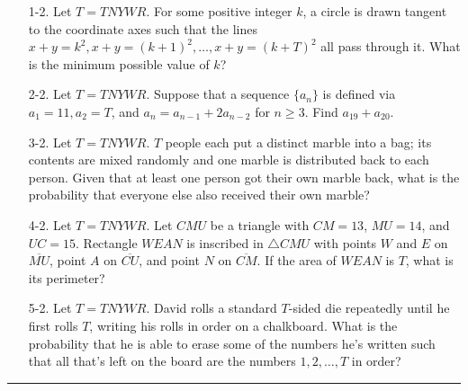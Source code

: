 \documentclass[10pt]{article}
\begin{document}
\begin{enumerate}

\item[1-2.] Let $T = TNYWR$. For some positive integer $k$, a circle is drawn tangent to the coordinate axes such that the lines $x + y = k^2, x + y = (k+1)^2, \dots, x+y = (k+T)^2$ all pass through it. What is the minimum possible value of $k$?

\item[2-2.] Let $T = TNYWR$. Suppose that a sequence $\{a_n\}$ is defined via $a_1 = 11, a_2 = T$, and $a_n = a_{n-1} + 2a_{n-2}$ for $n \ge 3$. Find $a_{19} + a_{20}$.

\item[3-2.] Let $T = TNYWR$. $T$ people each put a distinct marble into a bag; its contents are mixed randomly and one marble is distributed back to each person. Given that at least one person got their own marble back, what is the probability that everyone else also received their own marble?

\item[4-2.] Let $T = TNYWR$. Let $CMU$ be a triangle with $CM=13$, $MU=14$, and $UC=15$.  Rectangle $WEAN$ is inscribed in $\triangle CMU$ with points $W$ and $E$ on $\overline{MU}$, point $A$ on $\overline{CU}$, and point $N$ on $\overline{CM}$.  If the area of $WEAN$ is $T$, what is its perimeter?

\item[5-2.] Let $T = TNYWR$. David rolls a standard $T$-sided die repeatedly until he first rolls $T$, writing his rolls in order on a chalkboard. What is the probability that he is able to erase some of the numbers he's written such that all that's left on the board are the numbers $1, 2, \dots, T$ in order?

\end{enumerate}

\begin{center}
\noindent\rule{0.5\textwidth}{0.4pt}
\end{center}
\end{document}
